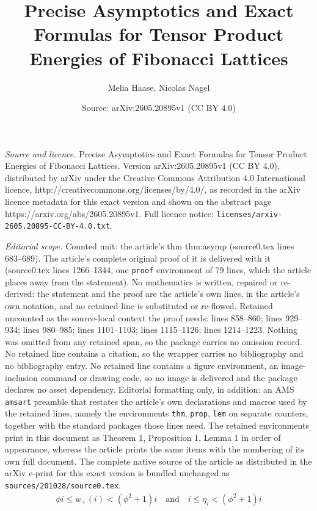 \documentclass[10pt,a4paper]{amsart}
\title{Precise Asymptotics and Exact Formulas for Tensor Product Energies of Fibonacci Lattices}
\author{Melia Haase, Nicolas Nagel}
\date{Source: arXiv:2605.20895v1 (CC BY 4.0)}
\begin{document}
\maketitle

\noindent\emph{Source and licence.} Precise Asymptotics and Exact Formulas for Tensor Product Energies of Fibonacci Lattices. Version arXiv:2605.20895v1 (CC BY 4.0), distributed by arXiv under the Creative Commons Attribution 4.0 International licence, http://creativecommons.org/licenses/by/4.0/, as recorded in the arXiv licence metadata for this exact version and shown on the abstract page https://arxiv.org/abs/2605.20895v1. Full licence notice: \texttt{licenses/arxiv-2605.20895-CC-BY-4.0.txt}.\par\smallskip

\noindent\textit{Editorial scope.} Counted unit: the article's thm thm:asymp (source0.tex lines 683--689). The article's complete original proof of it is delivered with it (source0.tex lines 1266--1344, one \texttt{proof} environment of 79 lines, which the article places away from the statement). No mathematics is written, repaired or re-derived: the statement and the proof are the article's own lines, in the article's own notation, and no retained line is substituted or re-flowed.  Retained uncounted as the source-local context the proof needs: lines 858--860; lines 929--934; lines 980--985; lines 1101--1103; lines 1115--1126; lines 1214--1223.  Nothing was omitted from any retained span, so the package carries no omission record.  No retained line contains a citation, so the wrapper carries no bibliography and no bibliography entry.  No retained line contains a figure environment, an image-inclusion command or drawing code, so no image is delivered and the package declares no asset dependency.  Editorial formatting only, in addition: an AMS \texttt{amsart} preamble that restates the article's own declarations and macros used by the retained lines, namely the environments \texttt{thm}, \texttt{prop}, \texttt{lem} on separate counters, together with the standard packages those lines need.  The retained environments print in this document as Theorem 1, Proposition 1, Lemma 1 in order of appearance, whereas the article prints the same items with the numbering of its own full document.  The complete native source of the article as distributed in the arXiv e-print for this exact version is bundled unchanged as \texttt{sources/201028/source0.tex}.
    \begin{align} \label{lin_growth}
        \phi i \leq w_+(i) < (\phi^2+1)i \quad \text{and} \quad i \leq \eta_i < (\phi^2+1) i
    \end{align}
\end{document}
